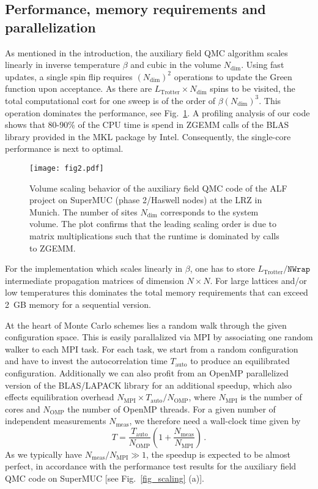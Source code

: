 \documentclass{SciPost}
\begin{document}
\subsection{Performance, memory requirements and parallelization}
%
As mentioned in the  introduction, the auxiliary field QMC algorithm scales linearly in inverse temperature $\beta$ and cubic in the volume $N_{\text{dim}}$. Using fast updates,  a single spin flip  requires $(N_{\text{dim}})^2$ operations to update the Green function upon acceptance.  As there are $L_{\text{Trotter}}\times N_{\text{dim}}$ spins to be visited, the total computational cost for one sweep is of the order of $\beta (N_{\text{dim}})^3$. This operation  dominates the performance, see Fig.~\ref{fig_scaling_size}. A profiling analysis of our code shows that 80-90\% of the CPU time is spend in ZGEMM calls of the BLAS library provided in the MKL package by Intel. Consequently, the single-core performance is next to optimal.

\begin{figure}[h]
	\begin{center}
		\texttt{[image: fig2.pdf]}
	\end{center}
	\caption{\label{fig_scaling_size}Volume scaling behavior of the auxiliary field QMC code of the ALF project on SuperMUC (phase 2/Haswell nodes) at the LRZ in Munich. The number of sites $N_{\text{dim}}$ corresponds to the system volume.
	The plot confirms that the leading scaling order is due to matrix multiplications such that the runtime is dominated by calls to ZGEMM. }
\end{figure}

For the implementation which scales linearly in $\beta$, one has to store $L_{\text{Trotter}}/\texttt{NWrap}$ intermediate propagation matrices of dimension $N\times N$. For large lattices and/or low temperatures this dominates the total memory requirements that can exceed 2~GB memory for a sequential version.

At the heart of Monte Carlo schemes lies a random walk through the given configuration space. This is easily parallalized via MPI by associating one random walker to each MPI task. For each task, we start from a random configuration and have to invest the autocorrelation time $T_\mathrm{auto}$ to produce an equilibrated configuration.
Additionally we can also profit from an OpenMP parallelized version of the BLAS/LAPACK library for an additional speedup, which also effects equilibration overhead $N_\text{MPI}\times T_\text{auto} / N_\text{OMP}$, where $N_{\text{MPI}}$ is the number of cores and $N_{\text{OMP}}$ the number of OpenMP threads.
For a given number of independent measurements  $N_\text{meas}$, we  therefore need a wall-clock time given by
\begin{equation}\label{eqn:scaling}
T  =  \frac{T_\text{auto}}{N_\text{OMP}} \left( 1   +    \frac{N_\text{meas}}{N_\text{MPI}}  \right) \,.
\end{equation}
As we typically have $ N_\text{meas}/N_\text{MPI} \gg 1 $, 
the speedup is expected to be almost perfect, in accordance with
the performance test results for the auxiliary field
QMC code  on SuperMUC [see Fig.~\ref{fig_scaling} (a)].
\end{document}
